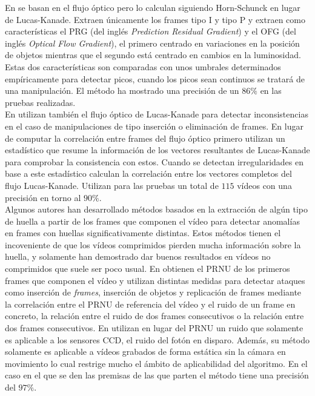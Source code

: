 En \cite{kingra:2017} se basan en el flujo óptico pero lo calculan siguiendo Horn-Schunck en lugar de Lucas-Kanade. Extraen únicamente los frames tipo I y tipo P y extraen como características el PRG (del inglés \textit{Prediction Residual Gradient}) y el OFG (del inglés \textit{Optical Flow Gradient}), el primero centrado en variaciones en la posición de objetos mientras que el segundo está centrado en cambios en la luminosidad. Estas dos características son comparadas con unos umbrales determinados empíricamente para detectar picos, cuando los picos sean continuos se tratará de una manipulación. El método ha mostrado una precisión de un $86\%$ en las pruebas realizadas. \\

En \cite{jia:2018} utilizan también el flujo óptico de Lucas-Kanade para detectar inconsistencias en el caso de manipulaciones de tipo inserción o eliminación de frames. En lugar de computar la correlación entre frames del flujo óptico primero utilizan un estadístico que resume la información de los vectores resultantes de Lucas-Kanade para comprobar la consistencia con estos. Cuando se detectan irregularidades en base a este estadístico calculan la correlación entre los vectores completos del flujo Lucas-Kanade. Utilizan para las pruebas un total de $115$ vídeos con una precisión en torno al $90\%$. \\

Algunos autores han desarrollado métodos basados en la extracción de algún tipo de huella a partir de los frames que componen el vídeo para detectar anomalías en frames con huellas significativamente distintas. Estos métodos tienen el incoveniente de que los vídeos comprimidos pierden mucha información sobre la huella, y solamente han demostrado dar buenos resultados en vídeos no comprimidos que suele ser poco usual. En \cite{mondaini:2007} obtienen el PRNU de los primeros frames que componen el vídeo y utilizan distintas medidas para detectar ataques como inserción de \textit{frames}, inserción de objetos y replicación de frames mediante la correlación entre el PRNU de referencia del vídeo y el ruido de un frame en concreto, la relación entre el ruido de dos frames consecutivos o la relación entre dos frames consecutivos. En \cite{kobayashi:2010} utilizan en lugar del PRNU un ruido que solamente es aplicable a los sensores CCD, el ruido del fotón en disparo. Además, su método solamente es aplicable a vídeos grabados de forma estática sin la cámara en movimiento lo cual restrige mucho el ámbito de aplicabilidad del algoritmo. En el caso en el que se den las premisas de las que parten el método tiene una precisión del $97\%$. \\

